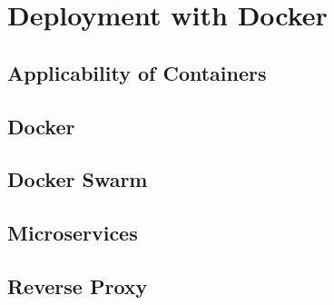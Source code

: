 \chapter[Deployment]{Deployment with Docker}

\section{Applicability of Containers}

\section{Docker}

\section{Docker Swarm}

\section{Microservices}

\section{Reverse Proxy}